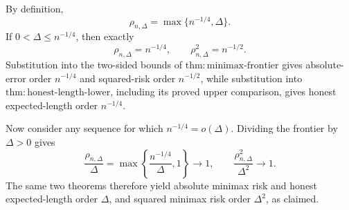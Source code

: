 By definition,
\[
 \rho_{n,\Delta}=\max\{n^{-1/4},\Delta\}.
\]
If \(0<\Delta\leq n^{-1/4}\), then exactly
\[
 \rho_{n,\Delta}=n^{-1/4},
 \qquad
 \rho_{n,\Delta}^2=n^{-1/2}.
\]
Substitution into the two-sided bounds of \(\mathrm{thm:minimax\text{-}frontier}\) gives absolute-error order \(n^{-1/4}\) and squared-risk order \(n^{-1/2}\), while substitution into \(\mathrm{thm:honest\text{-}length\text{-}lower}\), including its proved upper comparison, gives honest expected-length order \(n^{-1/4}\).

Now consider any sequence for which \(n^{-1/4}=o(\Delta)\).  Dividing the frontier by \(\Delta>0\) gives
\[
 \frac{\rho_{n,\Delta}}\Delta
 =\max\left\{\frac{n^{-1/4}}\Delta,1\right\}\longrightarrow1,
 \qquad
 \frac{\rho_{n,\Delta}^2}{\Delta^2}\longrightarrow1.
\]
The same two theorems therefore yield absolute minimax risk and honest expected-length order \(\Delta\), and squared minimax risk order \(\Delta^2\), as claimed.